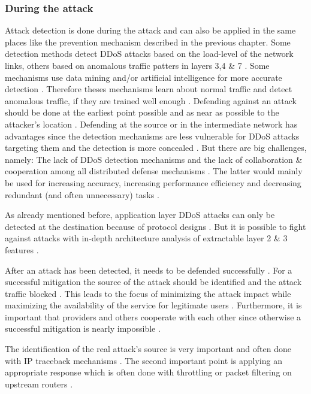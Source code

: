 \subsubsection*{During the attack}
Attack detection is done during the attack and can also be applied in the same places like the prevention mechanism described in the previous chapter. Some detection methods detect DDoS attacks based on the load-level of the network links, others based on anomalous traffic patters in layers 3,4 \& 7 \cite{DDoS-MitigationSurvey}. Some mechanisms use data mining and/or artificial intelligence for more accurate detection \cite{DDoS-MitigationSurvey}. Therefore theses mechanisms learn about normal traffic and detect anomalous traffic, if they are trained well enough \cite{DDoS-MitigationSurvey}. Defending against an attack should be done at the earliest point possible and as near as possible to the attacker's location \cite{DDoS-MitigationSurvey}. Defending at the source or in the intermediate network has advantages since the detection mechanisms are less vulnerable for DDoS attacks targeting them and the detection is more concealed \cite{DDoS-MitigationSurvey}. But there are big challenges, namely: The lack of DDoS detection mechanisms and the lack of collaboration \& cooperation among all distributed defense mechanisms \cite{DDoS-MitigationSurvey}. The latter would mainly be used for increasing accuracy, increasing performance efficiency and decreasing redundant (and often unnecessary) tasks \cite{DDoS-MitigationSurvey}. 

As already mentioned before, application layer DDoS attacks can only be detected at the destination because of protocol designs \cite{DDoS-MitigationSurvey}. But it is possible to fight against attacks with in-depth architecture analysis of extractable layer 2 \& 3 features \cite{DDoS-MitigationSurvey}. 

After an attack has been detected, it needs to be defended successfully \cite{DDoS-MitigationSurvey}. For a successful mitigation the source of the attack should be identified and the attack traffic blocked \cite{DDoS-MitigationSurvey}. This leads to the focus of minimizing the attack impact while maximizing the availability of the service for legitimate users \cite{DDoS-MitigationSurvey}. Furthermore, it is important that providers and others cooperate with each other since otherwise a successful mitigation is nearly impossible \cite{DDoS-MitigationSurvey}. 

The identification of the real attack's source is very important and often done with IP traceback mechanisms  \cite{DDoS-MitigationSurvey}. The second important point is applying an appropriate response which is often done with throttling or packet filtering on upstream routers \cite{DDoS-MitigationSurvey}. 

